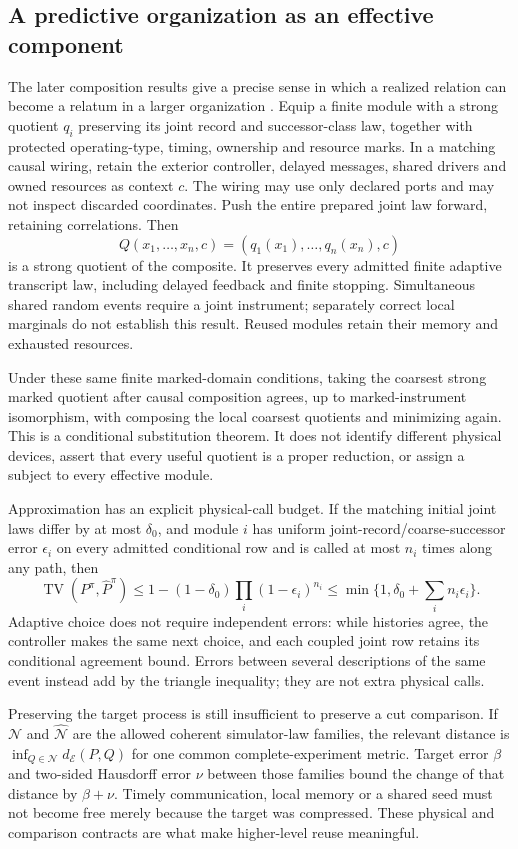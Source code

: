 \subsection{A predictive organization as an effective component}
\label{sec:update-encapsulation}
The later composition results give a precise sense in which a realized relation can become a relatum in a larger organization \cite{RodgersBoundaries2026}. Equip a finite module with a strong quotient $q_i$ preserving its joint record and successor-class law, together with protected operating-type, timing, ownership and resource marks. In a matching causal wiring, retain the exterior controller, delayed messages, shared drivers and owned resources as context $c$. The wiring may use only declared ports and may not inspect discarded coordinates. Push the entire prepared joint law forward, retaining correlations. Then
\[
Q(x_1,\ldots,x_n,c)=(q_1(x_1),\ldots,q_n(x_n),c)
\]
is a strong quotient of the composite. It preserves every admitted finite adaptive transcript law, including delayed feedback and finite stopping. Simultaneous shared random events require a joint instrument; separately correct local marginals do not establish this result. Reused modules retain their memory and exhausted resources.

Under these same finite marked-domain conditions, taking the coarsest strong marked quotient after causal composition agrees, up to marked-instrument isomorphism, with composing the local coarsest quotients and minimizing again. This is a conditional substitution theorem. It does not identify different physical devices, assert that every useful quotient is a proper reduction, or assign a subject to every effective module.

Approximation has an explicit physical-call budget. If the matching initial joint laws differ by at most $\delta_0$, and module $i$ has uniform joint-record/coarse-successor error $\epsilon_i$ on every admitted conditional row and is called at most $n_i$ times along any path, then
\[
\operatorname{TV}(P^\pi,\widehat P^\pi)
\le 1-(1-\delta_0)\prod_i(1-\epsilon_i)^{n_i}
\le\min\{1,\delta_0+\sum_i n_i\epsilon_i\}.
\]
Adaptive choice does not require independent errors: while histories agree, the controller makes the same next choice, and each coupled joint row retains its conditional agreement bound. Errors between several descriptions of the same event instead add by the triangle inequality; they are not extra physical calls.

Preserving the target process is still insufficient to preserve a cut comparison. If $\mathcal N$ and $\widehat{\mathcal N}$ are the allowed coherent simulator-law families, the relevant distance is $\inf_{Q\in\mathcal N}d_{\mathcal E}(P,Q)$ for one common complete-experiment metric. Target error $\beta$ and two-sided Hausdorff error $\nu$ between those families bound the change of that distance by $\beta+\nu$. Timely communication, local memory or a shared seed must not become free merely because the target was compressed. These physical and comparison contracts are what make higher-level reuse meaningful.

